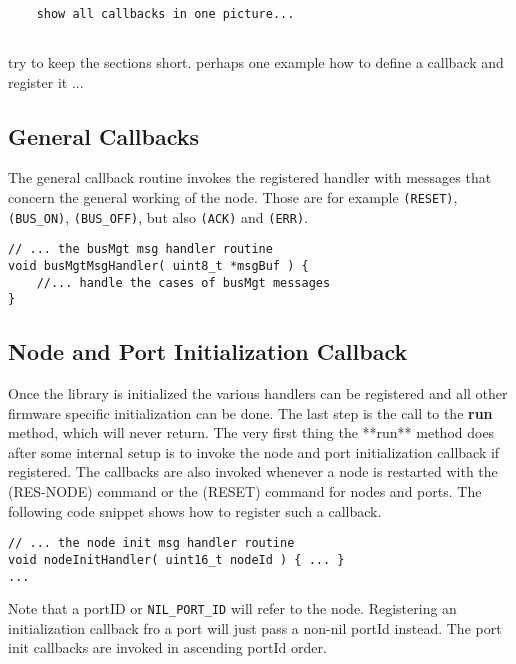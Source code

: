\lstset{language=c++, style=codesnippetstyle}
\begin{lstlisting}
   
    show all callbacks in one picture...
    
\end{lstlisting}

try to keep the sections short. perhaps one example how to define a callback and register it ...

\subsection{General Callbacks}

The general callback routine invokes the registered handler with messages that concern the general working of the node. Those are for example \texttt{(RESET)}, \texttt{(BUS\_ON)}, \texttt{(BUS\_OFF)}, but also \texttt{(ACK)} and \texttt{(ERR)}.

\lstset{style=codesnippetstyle}
\begin{lstlisting}
// ... the busMgt msg handler routine
void busMgtMsgHandler( uint8_t *msgBuf ) {
	//... handle the cases of busMgt messages
}
\end{lstlisting}

\subsection{Node and Port Initialization Callback}

Once the library is initialized the various handlers can be registered and all other firmware specific initialization can be done. The last step is the call to the \textbf{run} method, which will never return. The very first thing the **run** method does after some internal setup is to invoke the node and port initialization callback if registered. The callbacks are also invoked whenever a node is restarted with the (RES-NODE) command or the (RESET) command for nodes and ports. The following code snippet shows how to register such a callback.

\lstset{style=codesnippetstyle}
\begin{lstlisting}
// ... the node init msg handler routine
void nodeInitHandler( uint16_t nodeId ) { ... }
...
\end{lstlisting}

Note that a portID or \texttt{NIL\_PORT\_ID} will refer to the node. Registering an initialization callback fro a port will just pass a non-nil portId instead. The port init callbacks are invoked in ascending portId order.

